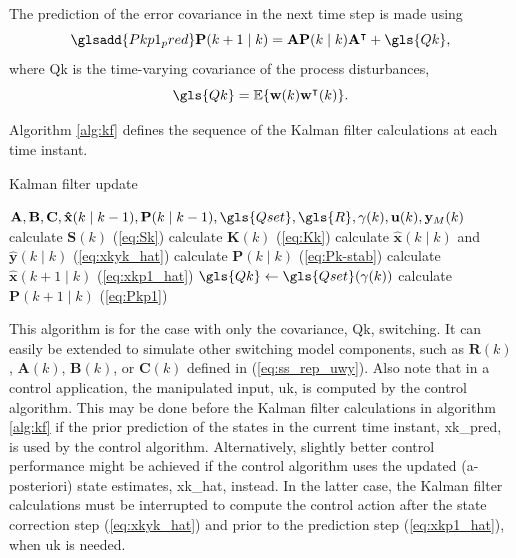 The prediction of the error covariance in the next time step is made using
\begin{equation} \label{eq:Pkp1} \glsadd{Pkp1_pred}
	\mathbf{P}(k+1 \mid k) = \mathbf{A} \mathbf{P}(k \mid k)  \mathbf{A}^\intercal  + \gls{Qk},
\end{equation}
where \gls{Qk} is the time-varying covariance of the process disturbances,
\begin{equation} \label{eq:Q}
	\gls{Qk} = \mathbb{E}\{ \mathbf{w}(k) \mathbf{w}^\intercal(k) \}.
\end{equation}

Algorithm \ref{alg:kf} defines the sequence of the Kalman filter calculations at each time instant. 
\begin{algorithm}
	\caption{Kalman filter update}\label{alg:kf}
	\begin{algorithmic}
		\Require $\mathbf{A},\mathbf{B},\mathbf{C},\mathbf{\hat{x}}(k \mid k-1), \mathbf{P}(k \mid k-1), \gls{Qset}, \gls{R}, \mathbf{\gamma}(k), \mathbf{u}(k), \mathbf{y}_M(k)$
		\State calculate $\mathbf{S}(k)$ (\ref{eq:Sk})
		\State calculate $\mathbf{K}(k)$ (\ref{eq:Kk})
		\State calculate $\mathbf{\hat{x}}(k \mid k)$ and $\mathbf{\hat{y}}(k \mid k)$ (\ref{eq:xkyk_hat})
		\State calculate $\mathbf{P}(k \mid k)$ (\ref{eq:Pk-stab})
		\State calculate $\mathbf{\hat{x}}(k+1 \mid k)$ (\ref{eq:xkp1_hat})
		\State $\gls{Qk} \gets \gls{Qset}(\gamma(k))$
		\State calculate $\mathbf{P}(k+1 \mid k)$ (\ref{eq:Pkp1})
	\end{algorithmic}
\end{algorithm}
This algorithm is for the case with only the covariance, \gls{Qk}, switching. It can easily be extended to simulate other switching model components, such as $\mathbf{R}(k)$, $\mathbf{A}(k)$, $\mathbf{B}(k)$, or $\mathbf{C}(k)$ defined in (\ref{eq:ss_rep_uwy}). Also note that in a control application, the manipulated input, \gls{uk}, is computed by the control algorithm. This may be done before the Kalman filter calculations in algorithm \ref{alg:kf} if the prior prediction of the states in the current time instant, \gls{xk_pred}, is used by the control algorithm. Alternatively, slightly better control performance might be achieved if the control algorithm uses the updated (a-posteriori) state estimates, \gls{xk_hat}, instead. In the latter case, the Kalman filter calculations must be interrupted to compute the control action after the state correction step (\ref{eq:xkyk_hat}) and prior to the prediction step (\ref{eq:xkp1_hat}), when \gls{uk} is needed.

